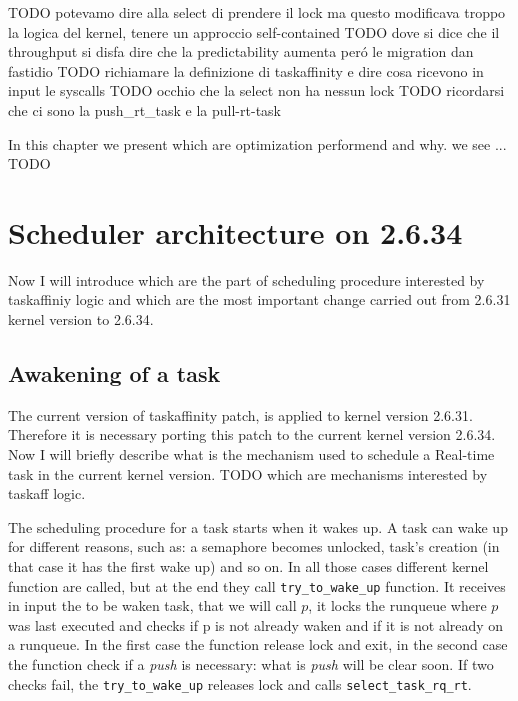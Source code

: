 TODO potevamo dire alla select di prendere il lock ma questo modificava troppo la logica del kernel, tenere un approccio self-contained
TODO dove si dice che il throughput si disfa dire che la predictability aumenta per\'o le migration dan fastidio
TODO richiamare la definizione di taskaffinity e dire cosa ricevono in input le syscalls
TODO occhio che la select non ha nessun lock
TODO ricordarsi che ci sono la push\_rt\_task e la pull-rt-task

In this chapter we present which are optimization performend and why. we see ... TODO 

\section{Scheduler architecture on 2.6.34}

Now I will introduce which are the part of scheduling procedure interested by taskaffiniy logic and which are the most important change carried out from
2.6.31 kernel version to 2.6.34.

\subsection{Awakening of a task}

The current version of taskaffinity patch, is applied to kernel version 2.6.31. Therefore it is necessary porting this patch to the current kernel version 
2.6.34. Now I will briefly describe what is the mechanism used to schedule a Real-time task in the current kernel version. 
TODO which are mechanisms interested by taskaff logic.

The scheduling procedure for a task starts when it wakes up. A task can wake up for different reasons, such as: a semaphore becomes unlocked, task's creation
(in that case it has the first wake up) and so on. In all those cases different kernel function are called, but at the end they call 
\texttt{try\_to\_wake\_up} function. It receives in input the to be waken task, that we will call $p$, it locks the runqueue where $p$ was last 
executed and checks if p is not already waken and if it is not already on a runqueue. In the first case the function release lock and exit, in the second
case the function check if a \textit{push} is necessary: what is \textit{push} will be clear soon. If two checks fail, the \texttt{try\_to\_wake\_up} 
releases lock and calls \texttt{select\_task\_rq\_rt}.

